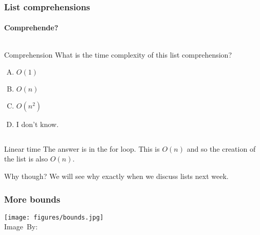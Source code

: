 \begin{frame}
	\frametitle{List comprehensions}
	\framesubtitle{Comprehende?}

	\begin{columns}
			
		\pause
		\begin{questionblock}{Comprehension}
			What is the time complexity of this list comprehension?
			\begin{enumerate}[A.]
				\item $O(1)$
				\item $O(n)$ 
				\item $O(n^2)$
				\item I don't know.
			\end{enumerate}
		\end{questionblock}
	\end{columns}
	\pause
	\begin{answerblock}{Linear time}
		The answer is in the for loop. This is $O(n)$ and so the creation of the list is also $O(n)$. 
	\end{answerblock}
	\pause
		\begin{block}{Why though?}
			We will see why exactly when we discuss lists next week.
		\end{block}	
\end{frame}

\begin{frame}
	\frametitle{More bounds}
	\begin{center}
		\texttt{[image: figures/bounds.jpg]}\\
		\hspace*{15pt}\hbox{\scriptsize Image By:}
	\end{center}
\end{frame}

